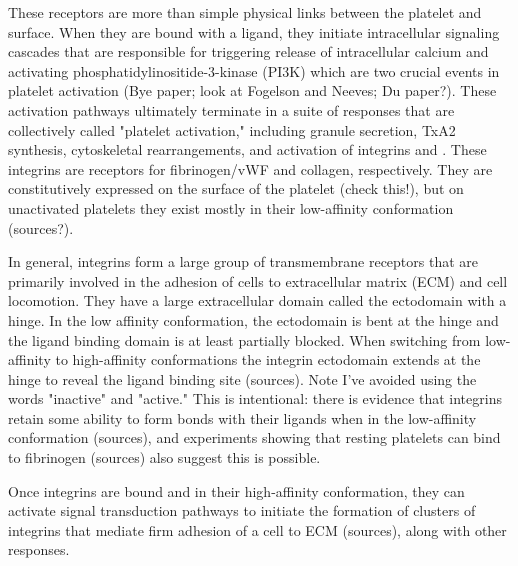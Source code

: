 These receptors are more than simple physical links between the
platelet and surface. When they are bound with a ligand, they initiate
intracellular signaling cascades that are responsible for triggering
release of intracellular calcium and activating
phosphatidylinositide-3-kinase (PI3K) which are two crucial events in
platelet activation (Bye paper; look at Fogelson and Neeves; Du
paper?). These activation pathways ultimately terminate in a suite of
responses that are collectively called "platelet activation,"
including granule secretion, TxA2 synthesis, cytoskeletal
rearrangements, and activation of integrins  and
. These integrins are receptors for fibrinogen/vWF
and collagen, respectively. They are constitutively expressed on the
surface of the platelet (check this!), but on unactivated platelets
they exist mostly in their low-affinity conformation (sources?).
		
In general, integrins form a large group of transmembrane receptors
that are primarily involved in the adhesion of cells to extracellular
matrix (ECM) and cell locomotion. They have a large extracellular
domain called the ectodomain with a hinge. In the low affinity
conformation, the ectodomain is bent at the hinge and the ligand
binding domain is at least partially blocked. When switching from
low-affinity to high-affinity conformations the integrin ectodomain
extends at the hinge to reveal the ligand binding site (sources). Note
I've avoided using the words "inactive" and "active." This is
intentional: there is evidence that integrins retain some ability to
form bonds with their ligands when in the low-affinity conformation
(sources), and experiments showing that resting platelets can bind to
fibrinogen (sources) also suggest this is possible.
		
Once integrins are bound and in their high-affinity conformation, they
can activate signal transduction pathways to initiate the formation of
clusters of integrins that mediate firm adhesion of a cell to ECM
(sources), along with other responses.
	

